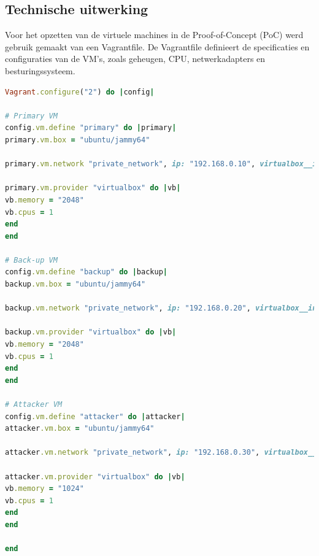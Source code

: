 \subsection{Technische uitwerking}
Voor het opzetten van de virtuele machines in de Proof-of-Concept (PoC) werd gebruik gemaakt van een Vagrantfile. De Vagrantfile definieert de specificaties en configuraties van de VM’s, zoals geheugen, CPU, netwerkadapters en besturingssysteem. 
\begin{lstlisting}[language=Ruby, caption={Vagrantfile voor drie VM's: Back-up Server, Client, en Attacker}]
Vagrant.configure("2") do |config|

# Primary VM
config.vm.define "primary" do |primary|
primary.vm.box = "ubuntu/jammy64"

primary.vm.network "private_network", ip: "192.168.0.10", virtualbox__intnet: "internal_network"

primary.vm.provider "virtualbox" do |vb|
vb.memory = "2048" 
vb.cpus = 1        
end
end

# Back-up VM
config.vm.define "backup" do |backup|
backup.vm.box = "ubuntu/jammy64"

backup.vm.network "private_network", ip: "192.168.0.20", virtualbox__intnet: "internal_network"

backup.vm.provider "virtualbox" do |vb|
vb.memory = "2048" 
vb.cpus = 1       
end
end

# Attacker VM
config.vm.define "attacker" do |attacker|
attacker.vm.box = "ubuntu/jammy64"

attacker.vm.network "private_network", ip: "192.168.0.30", virtualbox__intnet: "internal_network"

attacker.vm.provider "virtualbox" do |vb|
vb.memory = "1024" 
vb.cpus = 1        
end
end

end
\end{lstlisting}

